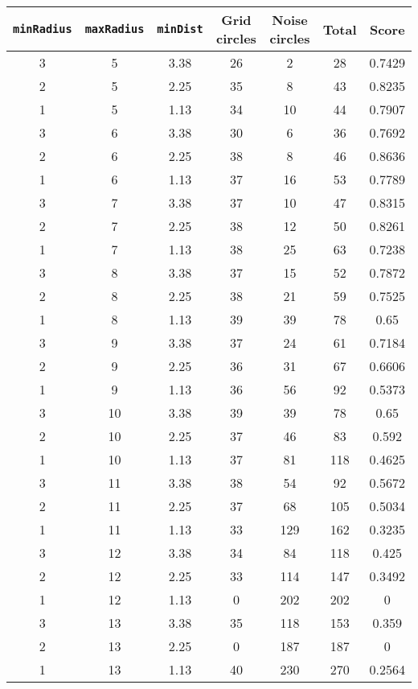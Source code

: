 \documentclass[letterpaper, 12pt]{article}
\begin{document}
\begin{longtable}{|c|c|c|c|c|c|c|}
\hline
\textbf{\texttt{minRadius}} & \textbf{\texttt{maxRadius}} & \textbf{\texttt{minDist}} & \textbf{Grid circles} & \textbf{Noise circles} & \textbf{Total} & \textbf{Score} \\
\hline
3 & 5 & 3.38 & 26 & 2 & 28 & 0.7429 \\
\hline
2 & 5 & 2.25 & 35 & 8 & 43 & 0.8235 \\
\hline
1 & 5 & 1.13 & 34 & 10 & 44 & 0.7907 \\
\hline
3 & 6 & 3.38 & 30 & 6 & 36 & 0.7692 \\
\hline
2 & 6 & 2.25 & 38 & 8 & 46 & 0.8636 \\
\hline
1 & 6 & 1.13 & 37 & 16 & 53 & 0.7789 \\
\hline
3 & 7 & 3.38 & 37 & 10 & 47 & 0.8315 \\
\hline
2 & 7 & 2.25 & 38 & 12 & 50 & 0.8261 \\
\hline
1 & 7 & 1.13 & 38 & 25 & 63 & 0.7238 \\
\hline
3 & 8 & 3.38 & 37 & 15 & 52 & 0.7872 \\
\hline
2 & 8 & 2.25 & 38 & 21 & 59 & 0.7525 \\
\hline
1 & 8 & 1.13 & 39 & 39 & 78 & 0.65 \\
\hline
3 & 9 & 3.38 & 37 & 24 & 61 & 0.7184 \\
\hline
2 & 9 & 2.25 & 36 & 31 & 67 & 0.6606 \\
\hline
1 & 9 & 1.13 & 36 & 56 & 92 & 0.5373 \\
\hline
3 & 10 & 3.38 & 39 & 39 & 78 & 0.65 \\
\hline
2 & 10 & 2.25 & 37 & 46 & 83 & 0.592 \\
\hline
1 & 10 & 1.13 & 37 & 81 & 118 & 0.4625 \\
\hline
3 & 11 & 3.38 & 38 & 54 & 92 & 0.5672 \\
\hline
2 & 11 & 2.25 & 37 & 68 & 105 & 0.5034 \\
\hline
1 & 11 & 1.13 & 33 & 129 & 162 & 0.3235 \\
\hline
3 & 12 & 3.38 & 34 & 84 & 118 & 0.425 \\
\hline
2 & 12 & 2.25 & 33 & 114 & 147 & 0.3492 \\
\hline
1 & 12 & 1.13 & 0 & 202 & 202 & 0 \\
\hline
3 & 13 & 3.38 & 35 & 118 & 153 & 0.359 \\
\hline
2 & 13 & 2.25 & 0 & 187 & 187 & 0 \\
\hline
1 & 13 & 1.13 & 40 & 230 & 270 & 0.2564 \\

\end{longtable}
\end{document}
